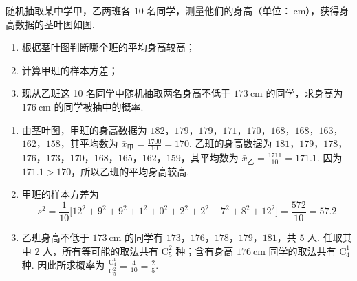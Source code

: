 \begin{problem}
随机抽取某中学甲，乙两班各 10 名同学，测量他们的身高（单位：\(\mathrm{~cm}\)），获得身高数据的茎叶图如图.



\begin{enumerate}
\item 根据茎叶图判断哪个班的平均身高较高；
\item 计算甲班的样本方差；
\item 现从乙班这 10 名同学中随机抽取两名身高不低于 \(173 \mathrm{~cm}\) 的同学，求身高为 \(176 \mathrm{~cm}\) 的同学被抽中的概率.
\end{enumerate}
\end{problem}

\begin{solution}
\begin{enumerate}
\item 由茎叶图，甲班的身高数据为 \(182\)，\(179\)，\(179\)，\(171\)，\(170\)，\(168\)，\(168\)，\(163\)，\(162\)，\(158\)，其平均数为
\(\bar{x}_{\text{甲}}=\frac{1700}{10}=170\). 乙班的身高数据为 \(181\)，\(179\)，\(178\)，\(176\)，\(173\)，\(170\)，\(168\)，\(165\)，\(162\)，\(159\)，其平均数为
\(\bar{x}_{\text{乙}}=\frac{1711}{10}=171.1\). 因为 \(171.1>170\)，所以乙班的平均身高较高.
\item 甲班的样本方差为
\[
s^2=\frac1{10}\bigl[12^2+9^2+9^2+1^2+0^2+2^2+2^2+7^2+8^2+12^2\bigr]
=\frac{572}{10}=57.2
\]
\item 乙班身高不低于 \(173 \mathrm{~cm}\) 的同学有 \(173\)，\(176\)，\(178\)，\(179\)，\(181\)，共 \(5\) 人. 任取其中 \(2\) 人，所有等可能的取法共有 \(\mathrm C_5^2\) 种；含有身高 \(176 \mathrm{~cm}\) 同学的取法共有 \(\mathrm C_4^1\) 种. 因此所求概率为
\(\frac{\mathrm C_4^1}{\mathrm C_5^2}=\frac{4}{10}=\frac25\).
\end{enumerate}
\end{solution}


